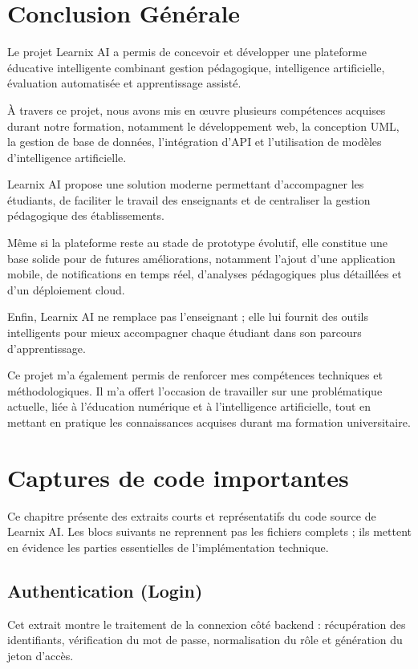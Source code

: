 \documentclass[12pt,a4paper]{report}
\begin{document}
\chapter*{Conclusion Générale}

Le projet Learnix AI a permis de concevoir et développer une plateforme
éducative intelligente combinant gestion pédagogique, intelligence artificielle,
évaluation automatisée et apprentissage assisté.

À travers ce projet, nous avons mis en œuvre plusieurs compétences acquises
durant notre formation, notamment le développement web, la conception UML, la
gestion de base de données, l'intégration d'API et l'utilisation de modèles
d'intelligence artificielle.

Learnix AI propose une solution moderne permettant d'accompagner les étudiants,
de faciliter le travail des enseignants et de centraliser la gestion pédagogique
des établissements.

Même si la plateforme reste au stade de prototype évolutif, elle constitue une
base solide pour de futures améliorations, notamment l'ajout d'une application
mobile, de notifications en temps réel, d'analyses pédagogiques plus détaillées et d'un déploiement
cloud.

Enfin, Learnix AI ne remplace pas l'enseignant ; elle lui fournit des outils
intelligents pour mieux accompagner chaque étudiant dans son parcours
d'apprentissage.

Ce projet m'a également permis de renforcer mes compétences techniques et
méthodologiques. Il m'a offert l'occasion de travailler sur une problématique
actuelle, liée à l'éducation numérique et à l'intelligence artificielle, tout en
mettant en pratique les connaissances acquises durant ma formation universitaire.



\appendix
\chapter{Captures de code importantes}

Ce chapitre présente des extraits courts et représentatifs du code source de
Learnix AI. Les blocs suivants ne reprennent pas les fichiers complets ; ils
mettent en évidence les parties essentielles de l'implémentation technique.

\section{Authentication (Login)}
Cet extrait montre le traitement de la connexion côté backend : récupération des
identifiants, vérification du mot de passe, normalisation du rôle et génération
du jeton d'accès.
\end{document}
